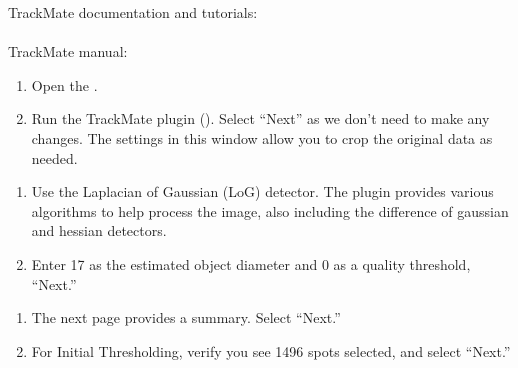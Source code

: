 \documentclass[letterpaper,10pt,english]{jupyterBook}
\begin{document}
\sphinxAtStartPar
TrackMate documentation and tutorials:\\
\\
TrackMate manual:\\

\sphinxAtStartPar
{}
\begin{enumerate}
%
\item {} 
\sphinxAtStartPar
Open the .

\item {} 
\sphinxAtStartPar
Run the TrackMate plugin (). Select “Next” as we don’t need to make any changes. The settings in this window allow you to crop the original data as needed.

\end{enumerate}

\sphinxAtStartPar
{}
\begin{enumerate}
%
\setcounter{enumi}{2}
\item {} 
\sphinxAtStartPar
Use the Laplacian of Gaussian (LoG) detector. The plugin provides various algorithms to help process the image, also including the difference of gaussian and hessian detectors.

\item {} 
\sphinxAtStartPar
Enter 17 as the estimated object diameter and 0 as a quality threshold, “Next.”

\end{enumerate}

\sphinxAtStartPar
{}
\begin{enumerate}
%
\setcounter{enumi}{4}
\item {} 
\sphinxAtStartPar
The next page provides a summary. Select “Next.”

\item {} 
\sphinxAtStartPar
For Initial Thresholding, verify you see 1496 spots selected, and select “Next.”

\end{enumerate}
\end{document}
